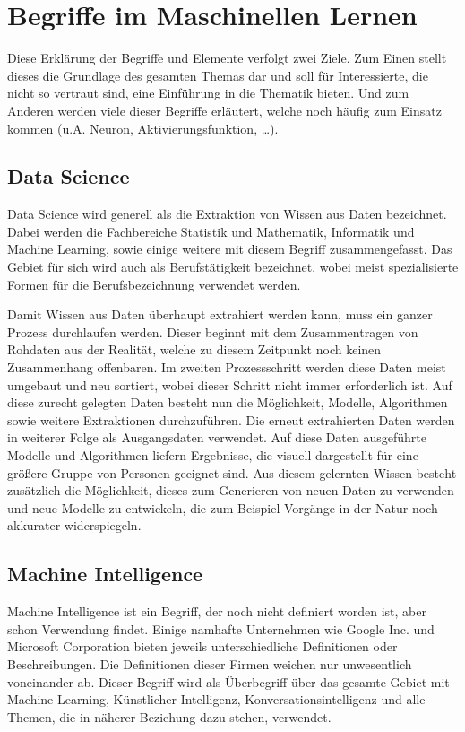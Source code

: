 \chapter{Begriffe im Maschinellen Lernen}
\label{cha:Begriffe}

Diese Erklärung der Begriffe und Elemente verfolgt zwei Ziele.
Zum Einen stellt dieses die Grundlage des gesamten Themas dar und soll für Interessierte, die nicht so vertraut sind, eine Einführung in die Thematik bieten. 
Und zum Anderen werden viele dieser Begriffe erläutert, welche noch häufig zum Einsatz kommen (u.A. Neuron, Aktivierungsfunktion, …).

\section{Data Science}

Data Science wird generell als die Extraktion von Wissen aus Daten bezeichnet. 
Dabei werden die Fachbereiche Statistik und Mathematik, Informatik und Machine Learning, sowie einige weitere mit diesem Begriff zusammengefasst. 
Das Gebiet für sich wird auch als Berufstätigkeit bezeichnet, wobei meist spezialisierte Formen für die Berufsbezeichnung verwendet werden. \newline

\noindent 
Damit Wissen aus Daten überhaupt extrahiert werden kann, muss ein ganzer Prozess durchlaufen werden. 
Dieser beginnt mit dem Zusammentragen von Rohdaten aus der Realität, welche zu diesem Zeitpunkt noch keinen Zusammenhang offenbaren. 
Im zweiten Prozessschritt werden diese Daten meist umgebaut und neu sortiert, wobei dieser Schritt nicht immer erforderlich ist. 
Auf diese zurecht gelegten Daten besteht nun die Möglichkeit, Modelle, Algorithmen sowie weitere Extraktionen durchzuführen. 
Die erneut extrahierten Daten werden in weiterer Folge als Ausgangsdaten verwendet. 
Auf diese Daten ausgeführte Modelle und Algorithmen liefern Ergebnisse, die visuell dargestellt für eine größere Gruppe von Personen geeignet sind. 
Aus diesem gelernten Wissen besteht zusätzlich die Möglichkeit, dieses zum Generieren von neuen Daten zu verwenden und neue Modelle zu entwickeln, die zum Beispiel Vorgänge in der Natur noch akkurater widerspiegeln.

\section{Machine Intelligence}

Machine Intelligence ist ein Begriff, der noch nicht definiert worden ist, aber schon Verwendung findet. 
Einige namhafte Unternehmen wie Google Inc. und Microsoft Corporation bieten jeweils unterschiedliche Definitionen oder Beschreibungen. 
Die Definitionen dieser Firmen weichen nur unwesentlich voneinander ab.
Dieser Begriff wird als Überbegriff über das gesamte Gebiet mit Machine Learning, Künstlicher Intelligenz, Konversationsintelligenz und alle Themen, die in näherer Beziehung dazu stehen, verwendet. 

